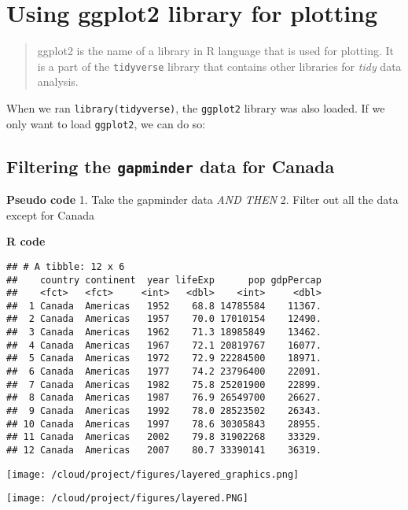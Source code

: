 \documentclass[]{article}
\begin{document}
\hypertarget{using-ggplot2-library-for-plotting}{%
\section{Using ggplot2 library for
plotting}\label{using-ggplot2-library-for-plotting}}

\begin{quote}
ggplot2 is the name of a library in R language that is used for
plotting. It is a part of the \texttt{tidyverse} library that contains
other libraries for \emph{tidy} data analysis.
\end{quote}

When we ran \texttt{library(tidyverse)}, the \texttt{ggplot2} library
was also loaded. If we only want to load \texttt{ggplot2}, we can do so:

\hypertarget{filtering-the-gapminder-data-for-canada}{%
\subsection{\texorpdfstring{Filtering the \texttt{gapminder} data for
\textbf{Canada}}{Filtering the gapminder data for Canada}}\label{filtering-the-gapminder-data-for-canada}}

\textbf{Pseudo code} 1. Take the gapminder data \emph{AND THEN} 2.
Filter out all the data except for Canada

\textbf{R code}

\begin{verbatim}
## # A tibble: 12 x 6
##    country continent  year lifeExp      pop gdpPercap
##    <fct>   <fct>     <int>   <dbl>    <int>     <dbl>
##  1 Canada  Americas   1952    68.8 14785584    11367.
##  2 Canada  Americas   1957    70.0 17010154    12490.
##  3 Canada  Americas   1962    71.3 18985849    13462.
##  4 Canada  Americas   1967    72.1 20819767    16077.
##  5 Canada  Americas   1972    72.9 22284500    18971.
##  6 Canada  Americas   1977    74.2 23796400    22091.
##  7 Canada  Americas   1982    75.8 25201900    22899.
##  8 Canada  Americas   1987    76.9 26549700    26627.
##  9 Canada  Americas   1992    78.0 28523502    26343.
## 10 Canada  Americas   1997    78.6 30305843    28955.
## 11 Canada  Americas   2002    79.8 31902268    33329.
## 12 Canada  Americas   2007    80.7 33390141    36319.
\end{verbatim}

\texttt{[image: /cloud/project/figures/layered\_graphics.png]}

\texttt{[image: /cloud/project/figures/layered.PNG]}
\end{document}
